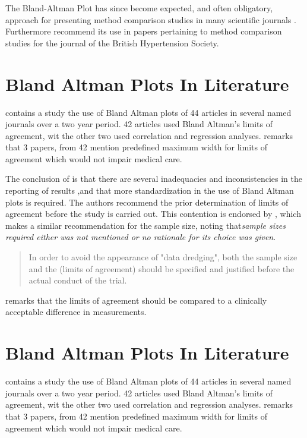 \documentclass[12pt, a4paper]{report}
\theoremstyle{plain}
\theoremstyle{definition}
\theoremstyle{remark}
\begin{document}
	The Bland-Altman Plot has since become expected, and
	often obligatory, approach for presenting method comparison
	studies in many scientific journals \citep{hollis}. Furthermore
	\citet{BritHypSoc} recommend its use in papers pertaining to
	method comparison studies for the journal of the British
	Hypertension Society.
	

	\section{Bland Altman Plots In Literature}
	\citet{mantha} contains a study the use of Bland Altman plots of
	44 articles in several named journals over a two year period. 42
	articles used Bland Altman's limits of agreement, wit the other
	two used correlation and regression analyses. \citet{mantha}
	remarks that 3 papers, from 42 mention predefined maximum width
	for limits of agreement which would not impair medical care.
	
	The conclusion of \citet{mantha} is that there are several
	inadequacies and inconsistencies in the reporting of results ,and
	that more standardization in the use of Bland Altman plots is
	required. The authors recommend the prior determination of limits
	of agreement before the study is carried out. This contention is
	endorsed by \citet{lin}, which makes a similar recommendation for
	the sample size, noting that\emph{sample sizes required either was
		not mentioned or no rationale for its choice was given}.
	
	\begin{quote}
		In order to avoid the appearance of "data dredging", both the
		sample size and the (limits of agreement) should be specified and
		justified before the actual conduct of the trial. \citep{lin}
	\end{quote}
	
	\citet{Dewitte} remarks that the limits of agreement should be
	compared to a clinically acceptable difference in measurements.



	\section{Bland Altman Plots In Literature}
	\citet{mantha} contains a study the use of Bland Altman plots of
	44 articles in several named journals over a two year period. 42
	articles used Bland Altman's limits of agreement, wit the other
	two used correlation and regression analyses. \citet{mantha}
	remarks that 3 papers, from 42 mention predefined maximum width
	for limits of agreement which would not impair medical care.
	
\end{document}
